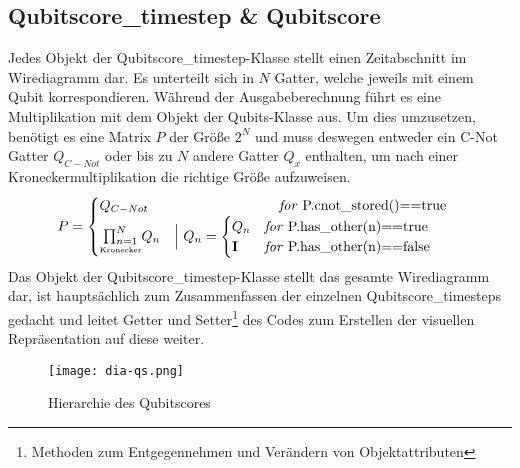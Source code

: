 \documentclass[12pt]{report}
\begin{document}
\subsection{Qubitscore\_timestep \& Qubitscore}
Jedes Objekt der \glqq Qubitscore\_timestep\grqq{}-Klasse stellt einen Zeitabschnitt im Wirediagramm dar. Es unterteilt sich in $N$ Gatter, welche jeweils mit einem Qubit korrespondieren. Während der Ausgabeberechnung führt es eine Multiplikation mit dem Objekt der \glqq Qubits\grqq{}-Klasse aus.
Um dies umzusetzen, benötigt es eine Matrix $P$ der Größe $2^N$ und muss deswegen entweder ein C-Not Gatter $Q_{C-Not}$ oder bis zu $N$ andere Gatter $Q_x$ enthalten, um nach einer Kroneckermultiplikation die richtige Größe aufzuweisen.
\begin{align}
P &=
  \begin{cases}
    Q_{C-Not} & \hspace{2.64cm} \text{\textit{for} P.cnot\_stored()==true}\\
    \begin{matrix}
    	\vspace{-0.25cm}\\
    	\prod_{n=1}^{N}\vspace{-0.2cm}\\
    	\text{\tiny{Kronecker}}
    \end{matrix}
    Q_{n} &\Big{\vert~}Q_{n}=
    \begin{cases}
      Q_{n} & \text{\textit{for} P.has\_other(n)==true}\\
      \textbf{I} & \text{\textit{for} P.has\_other(n)==false}
    \end{cases}
  \end{cases}
\end{align}
Das Objekt der \glqq Qubitscore\_timestep\grqq{}-Klasse stellt das gesamte Wirediagramm dar, ist hauptsächlich zum Zusammenfassen der einzelnen Qubitscore\_timesteps gedacht und leitet \glqq Getter\grqq{} und \glqq Setter\grqq\footnote{Methoden zum Entgegennehmen und Verändern von Objektattributen} des Codes zum Erstellen der visuellen Repräsentation auf diese weiter.
\begin{figure}%
\texttt{[image: dia-qs.png]}
\caption{Hierarchie des Qubitscores}
\end{figure}
\end{document}
